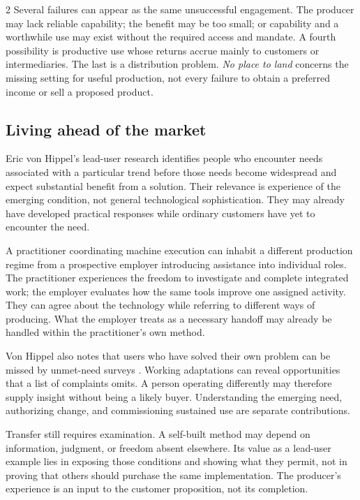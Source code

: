 \begin{multicols}{2}
Several failures can appear as the same unsuccessful engagement. The
producer may lack reliable capability; the benefit may be too small; or
capability and a worthwhile use may exist without the required access
and mandate. A fourth possibility is productive use whose returns accrue
mainly to customers or intermediaries. The last is a distribution
problem. \emph{No place to land} concerns the missing setting for useful
production, not every failure to obtain a preferred income or sell a
proposed product.

\subsection{Living ahead of the
market}\label{living-ahead-of-the-market}

Eric von Hippel's lead-user research \citep{vonhippel1986leadusers}
identifies people who encounter needs associated with a particular trend
before those needs become widespread and expect substantial benefit from
a solution. Their relevance is experience of the emerging condition, not
general technological sophistication. They may already have developed
practical responses while ordinary customers have yet to encounter the
need.

A practitioner coordinating machine execution can inhabit a different
production regime from a prospective employer introducing assistance
into individual roles. The practitioner experiences the freedom to
investigate and complete integrated work; the employer evaluates how the
same tools improve one assigned activity. They can agree about the
technology while referring to different ways of producing. What the
employer treats as a necessary handoff may already be handled within the
practitioner's own method.

Von Hippel also notes that users who have solved their own problem can
be missed by unmet-need surveys \citep{vonhippel1986leadusers}. Working
adaptations can reveal opportunities that a list of complaints omits. A
person operating differently may therefore supply insight without being
a likely buyer. Understanding the emerging need, authorizing change, and
commissioning sustained use are separate contributions.

Transfer still requires examination. A self-built method may depend on
information, judgment, or freedom absent elsewhere. Its value as a
lead-user example lies in exposing those conditions and showing what
they permit, not in proving that others should purchase the same
implementation. The producer's experience is an input to the customer
proposition, not its completion.


\end{multicols}
